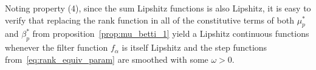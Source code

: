 \documentclass[10pt]{article}
\numberwithin{equation}{section}
\newcommand{\+}{%
	\raisebox{0.18ex}{\scaleobj{0.55}{+}}
}
\theoremstyle{definition}
\newtheorem{definition}{Definition}
\theoremstyle{definition}
\newcommand\numberthis{\addtocounter{equation}{1}\tag{\theequation}}
\begin{document}
\noindent Noting property (4), since the sum Lipshitz functions is also Lipshitz, it is easy to verify that 
replacing the rank function in all of the constitutive terms of both $\mu_p^\ast$ and $\beta_p^{\ast}$ from proposition~\ref{prop:mu_betti_1} yield a Lipshitz continuous functions whenever the filter function $f_\alpha$ is itself Lipshitz and the step functions from~\eqref{eq:rank_equiv_param} are smoothed with some $\omega > 0$. 
\end{document}
